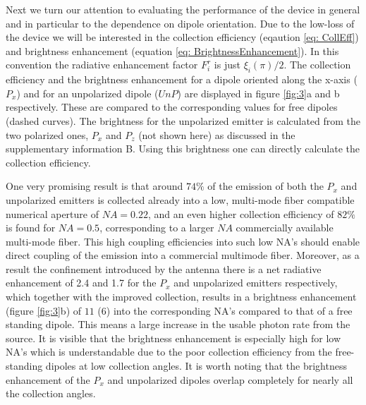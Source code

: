 \documentclass[10pt,onecolumn ]{article}
\begin{document}
Next we turn our attention to evaluating the performance of the device in general and in particular to the dependence on dipole orientation. 
Due to the low-loss of the device we will be interested in the collection efficiency (eqaution \ref{eq: CollEff}) and brightness enhancement (equation \ref{eq: BrightnessEnhancement}).
In this convention the radiative enhancement factor $F^r_i $ is just $\xi_i(\pi)/2$. 
The collection efficiency and the brightness enhancement for a dipole oriented along the x-axis ($P_x$) and for an unpolarized dipole ($UnP$) are displayed in figure \ref{fig:3}a and b respectively. 
These are compared to the corresponding values for free dipoles (dashed curves). 
The brightness for the unpolarized emitter is calculated from the two polarized ones, $P_x$ and $P_z$ (not shown here) as discussed in the supplementary information B. 
Using this brightness one can directly calculate the collection efficiency. 

One very promising result is that around $74\%$ of the emission of both the $P_x$ and unpolarized emitters is collected already into a low, multi-mode fiber compatible numerical aperture of $NA=0.22$, and an even higher collection efficiency of $82\%$ is found for $NA=0.5$, corresponding to a larger $NA$ commercially available multi-mode fiber.
This high coupling efficiencies into such low NA's should enable direct coupling of the emission into a commercial multimode fiber. 
Moreover, as a result the confinement introduced by the antenna there is a net radiative enhancement of 2.4 and 1.7 for the $P_x$ and unpolarized emitters respectively, which together with the improved collection, results 
in a brightness enhancement (figure \ref{fig:3}b) of $11$ ($6$) into the corresponding NA's compared to that of a free standing dipole. This means a large increase in the usable photon rate from the source.
It is visible that the brightness enhancement is especially high for low NA's which is understandable due to the poor collection efficiency from the free-standing dipoles at low collection angles. 
It is worth noting that the brightness enhancement of the $P_x$ and unpolarized dipoles overlap completely for nearly all the collection angles. 
 
\end{document}
